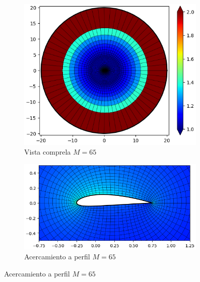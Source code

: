 \documentclass[letterpaper, openright, 12pt]{book}
\begin{document}
\begin{figure}[htbp!]
\begin{subfigure}[c]{0.48\textwidth}
            \includegraphics[keepaspectratio,
                width=0.99\textwidth]{./img/naca4415_m_65_aspect_far}
            \caption{Vista comprela $M=65$}
            \label{fig:naca4415_m_65_aspect_far}
        \end{subfigure}
        \hfill
        \begin{subfigure}[c]{0.48\textwidth}
            \includegraphics[keepaspectratio,
                width=0.99\textwidth]{./img/naca4415_m_65_aspect_close}
            \caption{Acercamiento a perfil $M=65$}
            \label{fig:naca4415_m_65_aspect_close}
        \end{subfigure}
    \end{figure}
\end{document}
